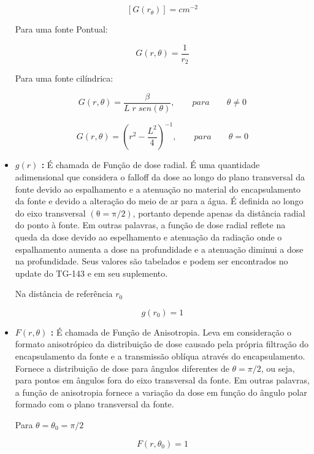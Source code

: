 \documentclass[11pt,a4paper]{article}
\begin{document}
\begin{itemize}
					$$[G(r_ \theta)] = cm^{-2}$$

					Para uma fonte Pontual:

					\begin{equation}
						G(r, \theta) = \frac{1}{r_2}
					\end{equation}

					Para uma fonte cilíndrica:

					\begin{equation}
						G(r, \theta) = \frac{\beta}{L \; r \; sen(\theta)}, \qquad para \qquad \theta \neq 0
					\end{equation}

					\begin{equation}
						G(r, \theta) = \left(r^2 - \frac{L^2}{4}\right)^{-1}, \qquad para \qquad \theta = 0
					\end{equation}
				
				\item \textbf{\textcolor{CarnationPink}{$g(r)$} : } É chamada de Função de dose radial. É uma quantidade adimensional que considera o falloff da dose ao longo do plano transversal da fonte devido ao espalhamento e a atenuação no material do encapsulamento da fonte e devido a alteração do meio de ar para a água. É definida ao longo do eixo transversal $\mathrm{(\theta = \pi / 2)}$, portanto depende apenas da distância radial do ponto à fonte. Em outras palavras, a função de dose radial reflete na queda da dose devido ao espelhamento e atenuação da radiação onde o espalhamento aumenta a dose na profundidade e a atenuação diminui a dose na profundidade. Seus valores são tabelados e podem ser encontrados no update do TG-143 e em seu suplemento.
				
					Na distância de referência $r_0$

					$$g(r_0) = 1$$
				
				\item \textbf{\textcolor{CarnationPink}{$F(r, \theta)$} : } É chamada de Função de Anisotropia. Leva em consideração o formato anisotrópico da distribuição de dose causado pela própria filtração do encapsulamento da fonte e a transmissão oblíqua através do encapsulamento. Fornece a distribuição de dose para ângulos diferentes de $\theta = \pi / 2$, ou seja, para pontos em ângulos fora do eixo transversal da fonte. Em outras palavras, a função de anisotropia fornece a variação da dose em função do ângulo polar formado com o plano transversal da fonte.
				
					Para $\theta = \theta_0 = \pi/2$

					$$F(r, \theta_0) = 1$$

			\end{itemize}
			
\end{document}
